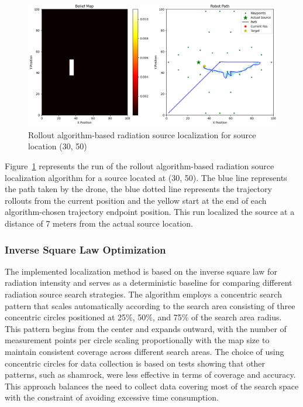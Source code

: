 \documentclass[../report.tex]{subfiles}
\begin{document}
    \begin{figure}[ht]
        \centering
        \includegraphics[width=\linewidth]{figures/rollout_algorithm.png}
        \caption{Rollout algorithm-based radiation source localization for source location (30, 50)}
        \label{fig:rollout_algorithm_plot}
    \end{figure}

    Figure~\ref{fig:rollout_algorithm_plot} represents the run of the rollout algorithm-based radiation source localization algorithm for a source located at (30, 50). The blue line represents 
    the path taken by the drone, the blue dotted line represents the trajectory rollouts from the current position and the yellow start at the end of each algorithm-chosen trajectory endpoint
    position. This run localized the source at a distance of 7 meters from the actual source location. 

    \subsubsection{Inverse Square Law Optimization}
    The implemented localization method is based on the inverse square law for radiation intensity and serves as a deterministic baseline for comparing different 
    radiation source search strategies. The algorithm employs a concentric search pattern that scales automatically according to the search area consisting of 
    three concentric circles positioned at 25\%, 50\%, and 75\% of the search area radius. This pattern begins from the center and expands outward, with the number 
    of measurement points per circle scaling proportionally with the map size to maintain consistent coverage across different search areas. The choice of using 
    concentric circles for data collection is based on tests showing that other patterns, such as shamrock, were less effective in terms of coverage and accuracy. 
    This approach balances the need to collect data covering most of the search space with the constraint of avoiding excessive time consumption.
\end{document}
